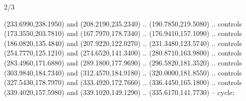 \begin{flagdescription}{2/3}
\begin{scope}[xshift=0.5\flaglength,yshift=0.5\flagwidth,scale=\flagwidth/450]
\begin{scope}[y=1pt, x=1pt, yscale=-1,shift={(-337.5,-225)}]
    (233.6990,238.1950) and (208.2190,235.2340) .. (190.7850,219.5080) .. controls
    (173.3550,203.7810) and (167.7970,178.7340) .. (176.9410,157.1090) .. controls
    (186.0820,135.4840) and (207.9220,122.0270) .. (231.3480,123.5740) .. controls
    (254.7770,125.1210) and (274.6520,141.3400) .. (280.8710,163.9800) .. controls
    (283.4960,171.6880) and (289.1800,177.9690) .. (296.5820,181.3520) .. controls
    (303.9840,184.7340) and (312.4570,184.9180) .. (320.0000,181.8550) .. controls
    (327.5430,178.7970) and (333.4920,172.7660) .. (336.4450,165.1800) .. controls
    (339.4020,157.5980) and (339.1020,149.1290) .. (335.6170,141.7730) -- cycle;
\end{scope}
\end{scope}
\framecode{}
\end{flagdescription}
